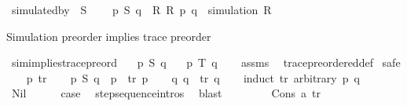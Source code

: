 \begin{isabellebody}
\isanewline
{}\isamarkupfalse%
\ simulated{\isacharunderscore}{\kern0pt}by\ {\isacharparenleft}{\kern0pt}\ {\isacartoucheopen}{\isasymlesssim}S{\isacartoucheclose}\ {}{}{\isacharparenright}{\kern0pt}\isanewline
\ \ \ {\isacartoucheopen}p\ {\isasymlesssim}S\ q\ {\isasymequiv}\ {\isasymexists}R{\isachardot}{\kern0pt}\ R\ p\ q\ {\isasymand}\ simulation\ R{\isacartoucheclose}%
\begin{isamarkuptext}%
Simulation preorder implies trace preorder%
\end{isamarkuptext}\isamarkuptrue%
\isamarkupfalse%
\ sim{\isacharunderscore}{\kern0pt}implies{\isacharunderscore}{\kern0pt}trace{\isacharunderscore}{\kern0pt}preord{\isacharcolon}{\kern0pt}\isanewline
\ \ \ {\isacartoucheopen}p\ {\isasymlesssim}S\ q{\isacartoucheclose}\isanewline
\ \ \ {\isacartoucheopen}p\ {\isasymlesssim}T\ q{\isacartoucheclose}\isanewline
%
\isadelimproof
\ \ %
\endisadelimproof
%
\isatagproof
{}\isamarkupfalse%
\ assms\ \isamarkupfalse%
\ trace{\isacharunderscore}{\kern0pt}preordered{\isacharunderscore}{\kern0pt}def\isanewline
{}\isamarkupfalse%
\ safe\isanewline
\ \ \isamarkupfalse%
\ p{\isacharprime}{\kern0pt}{\isacharprime}{\kern0pt}\ tr\isanewline
\ \ \isamarkupfalse%
\ {\isacartoucheopen}p\ {\isasymlesssim}S\ q{\isacartoucheclose}\ \ {\isacartoucheopen}p\ {\isasymmapsto}{\isachardollar}{\kern0pt}\ tr\ p{\isacharprime}{\kern0pt}{\isacharprime}{\kern0pt}{\isacartoucheclose}\isanewline
\ \ \isamarkupfalse%
\ {\isacartoucheopen}{\isasymexists}q{\isacharprime}{\kern0pt}{\isachardot}{\kern0pt}\ q\ {\isasymmapsto}{\isachardollar}{\kern0pt}\ tr\ q{\isacharprime}{\kern0pt}{\isacartoucheclose}\isanewline
\ \ \isamarkupfalse%
\ {\isacharparenleft}{\kern0pt}induct\ tr\ arbitrary{\isacharcolon}{\kern0pt}\ p\ q{\isacharparenright}{\kern0pt}\isanewline
\ \ \ \ \isamarkupfalse%
\ Nil\isanewline
\ \ \ \ \isamarkupfalse%
\ {\isacharquery}{\kern0pt}case\ \isamarkupfalse%
\ step{\isacharunderscore}{\kern0pt}sequence{\isachardot}{\kern0pt}intros{\isacharparenleft}{\kern0pt}{}{\isacharparenright}{\kern0pt}\ \isamarkupfalse%
\ blast\isanewline
\ \ \isamarkupfalse%
\isanewline
\ \ \ \ \isamarkupfalse%
\ {\isacharparenleft}{\kern0pt}Cons\ a\ tr{\isacharparenright}{\kern0pt}\isanewline

\end{isabellebody}
